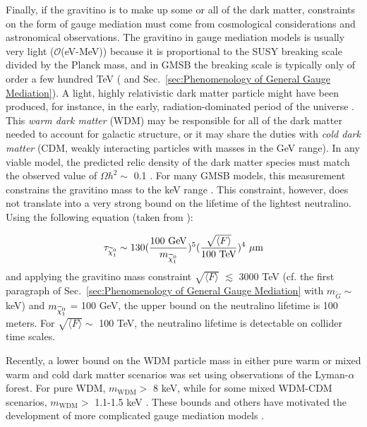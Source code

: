 \documentclass[dissertation.tex]{subfiles}
\begin{document}
Finally, if the gravitino is to make up some or all of the dark matter, constraints on the form of gauge mediation must come from cosmological considerations and astronomical observations.  The gravitino in gauge mediation models is usually very light ($\mathcal{O}$(eV-MeV)) because it is proportional to the SUSY breaking scale divided by the Planck mass, and in GMSB the breaking scale is typically only of order a few hundred TeV (\cite{SUSY_primer} and Sec.~\ref{sec:Phenomenology of General Gauge Mediation}).  A light, highly relativistic dark matter particle might have been produced, for instance, in the early, radiation-dominated period of the universe \cite{Lyman_alpha_DM_limits}.  This \textit{warm dark matter} (WDM) may be responsible for all of the dark matter needed to account for galactic structure, or it may share the duties with \textit{cold dark matter} (CDM, weakly interacting particles with masses in the GeV range).  In any viable model, the predicted relic density of the dark matter species must match the observed value of $\Omega h^{2} \sim$ 0.1 \cite{WMAP}.  For many GMSB models, this measurement constrains the gravitino mass to the keV range \cite{long_lived_neutralinos_at_the_Tevatron}.  This constraint, however, does not translate into a very strong bound on the lifetime of the lightest neutralino.  Using the following equation (taken from \cite{long_lived_neutralinos_at_the_Tevatron}):

\begin{equation}
\tau_{\widetilde{\chi}_{1}^{0}} \sim 130(\frac{100\mbox{ GeV}}{m_{\widetilde{\chi}_{1}^{0}}})^{5}(\frac{\sqrt{\langle F\rangle}}{100\mbox{ TeV}})^{4}\mbox{ }\mu\mbox{m}
\end{equation}
%
and applying the gravitino mass constraint $\sqrt{\langle F\rangle}$ $\lesssim$ 3000 TeV (cf. the first paragraph of Sec.~\ref{sec:Phenomenology of General Gauge Mediation} with $m_{\widetilde{G}} \sim$ keV) and $m_{\widetilde{\chi}_{1}^{0}}$ = 100 GeV, the upper bound on the neutralino lifetime is 100 meters.  For $\sqrt{\langle F\rangle} \sim$ 100 TeV, the neutralino lifetime is detectable on collider time scales.

Recently, a lower bound on the WDM particle mass in either pure warm or mixed warm and cold dark matter scenarios was set using observations of the Lyman-$\alpha$ forest.  For pure WDM, $m_{\mathrm{WDM}} >$ 8 keV, while for some mixed WDM-CDM scenarios, $m_{\mathrm{WDM}} >$ 1.1-1.5 keV \cite{Lyman_alpha_DM_limits, cosmo_constraints_on_GMSB}.  These bounds and others have motivated the development of more complicated gauge mediation models \cite{cosmo_constraints_on_GMSB}.
\end{document}
